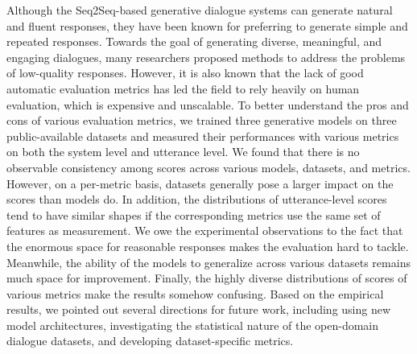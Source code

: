 \begin{eabstract}
    Although the Seq2Seq-based generative dialogue systems can generate natural and fluent responses, they have been known for preferring to generate simple and repeated responses. Towards the goal of generating diverse, meaningful, and engaging dialogues, many researchers proposed methods to address the problems of low-quality responses. However, it is also known that the lack of good automatic evaluation metrics has led the field to rely heavily on human evaluation, which is expensive and unscalable. To better understand the pros and cons of various evaluation metrics, we trained three generative models on three public-available datasets and measured their performances with various metrics on both the system level and utterance level. We found that there is no observable consistency among scores across various models, datasets, and metrics. However, on a per-metric basis, datasets generally pose a larger impact on the scores than models do. In addition, the distributions of utterance-level scores tend to have similar shapes if the corresponding metrics use the same set of features as measurement. We owe the experimental observations to the fact that the enormous space for reasonable responses makes the evaluation hard to tackle. Meanwhile, the ability of the models to generalize across various datasets remains much space for improvement. Finally, the highly diverse distributions of scores of various metrics make the results somehow confusing. Based on the empirical results, we pointed out several directions for future work, including using new model architectures, investigating the statistical nature of the open-domain dialogue datasets, and developing dataset-specific metrics.
\end{eabstract}
